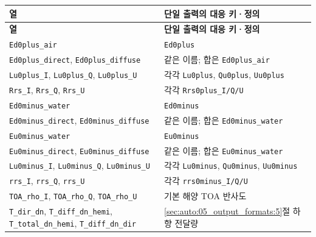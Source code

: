 {\TableFont
\begin{longtable}{@{}>{\raggedright\arraybackslash}p{}>{\raggedright\arraybackslash}p{}@{}}
\toprule
\textbf{열} & \textbf{단일 출력의 대응 키·정의} \\
\midrule
\endfirsthead
\toprule
\textbf{열} & \textbf{단일 출력의 대응 키·정의} \\
\midrule
\endhead
\bottomrule
\endfoot
\texttt{Ed0plus\_\allowbreak{}air} & \texttt{Ed0plus} \\
\texttt{Ed0plus\_\allowbreak{}direct}, \texttt{Ed0plus\_\allowbreak{}diffuse} & 같은 이름; 합은 \texttt{Ed0plus\_\allowbreak{}air} \\
\texttt{Lu0plus\_\allowbreak{}I}, \texttt{Lu0plus\_\allowbreak{}Q}, \texttt{Lu0plus\_\allowbreak{}U} & 각각 \texttt{Lu0plus}, \texttt{Qu0plus}, \texttt{Uu0plus} \\
\texttt{Rrs\_\allowbreak{}I}, \texttt{Rrs\_\allowbreak{}Q}, \texttt{Rrs\_\allowbreak{}U} & 각각 \texttt{Rrs0plus\_\allowbreak{}I/\allowbreak{}Q/\allowbreak{}U} \\
\texttt{Ed0minus\_\allowbreak{}water} & \texttt{Ed0minus} \\
\texttt{Ed0minus\_\allowbreak{}direct}, \texttt{Ed0minus\_\allowbreak{}diffuse} & 같은 이름; 합은 \texttt{Ed0minus\_\allowbreak{}water} \\
\texttt{Eu0minus\_\allowbreak{}water} & \texttt{Eu0minus} \\
\texttt{Eu0minus\_\allowbreak{}direct}, \texttt{Eu0minus\_\allowbreak{}diffuse} & 같은 이름; 합은 \texttt{Eu0minus\_\allowbreak{}water} \\
\texttt{Lu0minus\_\allowbreak{}I}, \texttt{Lu0minus\_\allowbreak{}Q}, \texttt{Lu0minus\_\allowbreak{}U} & 각각 \texttt{Lu0minus}, \texttt{Qu0minus}, \texttt{Uu0minus} \\
\texttt{rrs\_\allowbreak{}I}, \texttt{rrs\_\allowbreak{}Q}, \texttt{rrs\_\allowbreak{}U} & 각각 \texttt{rrs0minus\_\allowbreak{}I/\allowbreak{}Q/\allowbreak{}U} \\
\texttt{TOA\_\allowbreak{}rho\_\allowbreak{}I}, \texttt{TOA\_\allowbreak{}rho\_\allowbreak{}Q}, \texttt{TOA\_\allowbreak{}rho\_\allowbreak{}U} & 기본 해양 TOA 반사도 \\
\texttt{T\_\allowbreak{}dir\_\allowbreak{}dn}, \texttt{T\_\allowbreak{}diff\_\allowbreak{}dn\_\allowbreak{}hemi}, \texttt{T\_\allowbreak{}total\_\allowbreak{}dn\_\allowbreak{}hemi}, \texttt{T\_\allowbreak{}diff\_\allowbreak{}dn\_\allowbreak{}dir} & \ref{sec:auto:05_output_formats:5}절 하향 전달량 \\

\end{longtable}}
